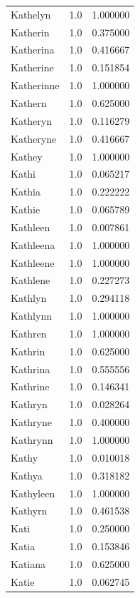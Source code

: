 \documentclass[
  letterpaper,
  DIV=11,
  numbers=noendperiod]{scrreprt}
\begin{document}
\begin{tabular}{lrr}
Kathelyn        &   1.0 &   1.000000 \\
Katherin        &   1.0 &   0.375000 \\
Katherina       &   1.0 &   0.416667 \\
Katherine       &   1.0 &   0.151854 \\
Katherinne      &   1.0 &   1.000000 \\
Kathern         &   1.0 &   0.625000 \\
Katheryn        &   1.0 &   0.116279 \\
Katheryne       &   1.0 &   0.416667 \\
Kathey          &   1.0 &   1.000000 \\
Kathi           &   1.0 &   0.065217 \\
Kathia          &   1.0 &   0.222222 \\
Kathie          &   1.0 &   0.065789 \\
Kathleen        &   1.0 &   0.007861 \\
Kathleena       &   1.0 &   1.000000 \\
Kathleene       &   1.0 &   1.000000 \\
Kathlene        &   1.0 &   0.227273 \\
Kathlyn         &   1.0 &   0.294118 \\
Kathlynn        &   1.0 &   1.000000 \\
Kathren         &   1.0 &   1.000000 \\
Kathrin         &   1.0 &   0.625000 \\
Kathrina        &   1.0 &   0.555556 \\
Kathrine        &   1.0 &   0.146341 \\
Kathryn         &   1.0 &   0.028264 \\
Kathryne        &   1.0 &   0.400000 \\
Kathrynn        &   1.0 &   1.000000 \\
Kathy           &   1.0 &   0.010018 \\
Kathya          &   1.0 &   0.318182 \\
Kathyleen       &   1.0 &   1.000000 \\
Kathyrn         &   1.0 &   0.461538 \\
Kati            &   1.0 &   0.250000 \\
Katia           &   1.0 &   0.153846 \\
Katiana         &   1.0 &   0.625000 \\
Katie           &   1.0 &   0.062745 \\

\end{tabular}
\end{document}
